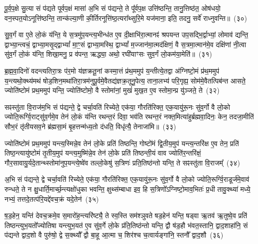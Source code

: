 पू॒र्व॒प॒क्षे सु॒त्या सं प॑द्यते पूर्वप॒क्षं मासा॑ अ॒भि सं प॑द्यन्ते॒ ते पू᳚र्वप॒क्ष उत्ति॑ष्ठन्ति॒ तानु॒त्तिष्ठ॑त॒ ओष॑धयो॒ वन॒स्पत॒यो\-ऽनूत्ति॑ष्ठन्ति॒ तान्क॑ल्या॒णी की॒र्तिरनूत्ति॑ष्ठ॒त्यरा᳚थ्सुरि॒मे यज॑माना॒ इति॒ तदनु॒ सर्वे॑ राध्नुवन्ति॥~(३०)\ip

{\anuvakamend[{ए॒तच्छ॒म्बट्कु॑र्वन्ति॒ तेषा॒ञ्चतु॑स्त्रिꣳशच्च}]}

सु॒व॒र्गं वा ए॒ते लो॒कं य॑न्ति॒ ये स॒त्रमु॑प॒यन्त्य॒भीन्ध॑त ए॒व दी॒क्षाभि॑रा॒त्मानꣴ॑ श्रपयन्त उप॒सद्भि॒र्द्वाभ्यां॒ लोमाव॑ द्यन्ति॒ द्वाभ्या॒न्त्वचं॒ द्वाभ्या॒मसृ॒द्द्वाभ्यां᳚ मा॒ꣳ॒सं द्वाभ्या॒मस्थि॒ द्वाभ्यां᳚ म॒ज्जान॑मा॒त्मद॑क्षिणं॒ वै स॒त्रमा॒त्मान॑मे॒व दक्षि॑णां नी॒त्वा सु॑व॒र्गं लो॒कं य॑न्ति॒ शिखा॒मनु॒ प्र व॑पन्त॒ ऋद्ध्या॒ अथो॒ रघी॑याꣳसः सुव॒र्गं लो॒कम॑या॒मेति॑॥~(३१)\ip

{\anuvakamend[{सु॒व॒र्गं प॑ञ्चा॒शत्}]}

ब्र॒ह्म॒वा॒दिनो॑ वदन्त्यतिरा॒त्रः प॑र॒मो य॑ज्ञक्रतू॒नां कस्मा॒त्तं प्र॑थ॒ममुप॑ य॒न्तीत्ये॒तद्वा अ॑ग्निष्टो॒मं प्र॑थ॒ममुप॑ य॒न्त्यथो॒क्थ्य॑मथ॑ षोड॒शिन॒मथा॑तिरा॒त्रम॑नुपू॒र्वमे॒वैतद्य॑ज्ञक्र॒तूनु॒पेत्य॒ ताना॒लभ्य॑ परि॒गृह्य॒ सोम॑मे॒वैतत्पिब॑न्त आसते॒ ज्योति॑ष्टोमं प्रथ॒ममुप॑ यन्ति॒ ज्योति॑ष्टोमो॒ वै स्तोमा॑नां॒ मुखं॑ मुख॒त ए॒व स्तोमा॒न्प्र यु॑ञ्जते॒ ते~(३२)\ip

सꣴस्तु॑ता वि॒राज॑म॒भि सं प॑द्यन्ते॒ द्वे चर्चा॒वति॑ रिच्येते॒ एक॑या॒ गौरति॑रिक्त॒ एक॒यायु॑रू॒नः सु॑व॒र्गो वै लो॒को ज्योति॒रूर्ग्वि॒राट्सु॑व॒र्गमे॒व तेन॑ लो॒कं य॑न्ति रथन्त॒रं दिवा॒ भव॑ति रथन्त॒रं नक्त॒मित्या॑हुर्ब्रह्मवा॒दिनः॒ केन॒ तदजा॒मीति॑ सौभ॒रं तृ॑तीय\-सव॒ने ब्र॑ह्मसा॒मं बृ॒हत्तन्म॑ध्य॒तो द॑धति॒ विधृ॑त्यै॒ तेनाजा॑मि॥~(३३)\ip

{\anuvakamend[{त एका॒न्नप॑ञ्चा॒शच्च॑}]}%

ज्योति॑ष्टोमं प्रथ॒ममुप॑ यन्त्य॒स्मिन्ने॒व तेन॑ लो॒के प्रति॑ तिष्ठन्ति॒ गोष्टो॑मं द्वि॒तीय॒मुप॑ यन्त्य॒न्तरि॑क्ष ए॒व तेन॒ प्रति॑ तिष्ठ॒न्त्यायु॑ष्टोमं तृ॒तीय॒मुप॑ यन्त्य॒मुष्मि॑न्ने॒व तेन॑ लो॒के प्रति॑ तिष्ठन्ती॒यं वाव ज्योति॑र॒न्तरि॑क्षं॒ गौर॒सावायु॒र्यदे॒तान्थ्स्तोमा॑नुप॒यन्त्ये॒ष्वे॑व तल्लो॒केषु॑ स॒त्रिणः॑ प्रति॒तिष्ठ॑न्तो यन्ति॒ ते सꣴस्तु॑ता वि॒राजम्᳚~(३४)\ip

अ॒भि सं प॑द्यन्ते॒ द्वे चर्चा॒वति॑ रिच्येते॒ एक॑या॒ गौरति॑रिक्त॒ एक॒यायु॑रू॒नः सु॑व॒र्गो वै लो॒को ज्योति॒रूर्ग्वि॒राडूर्ज॑मे॒वाव॑ रुन्धते॒ ते न क्षु॒धार्ति॒मार्च्छ॒न्त्यक्षो॑धुका भवन्ति॒ क्षुथ्स॑म्बाधा इव॒ हि स॒त्रिणो᳚\-ऽग्निष्टो॒माव॒भितः॑ प्र॒धी तावु॒क्थ्या॑ मध्ये॒ नभ्यं॒ तत्तदे॒तत्प॑रि॒यद्दे॑वच॒क्रं यदे॒तेन॑~(३५)\ip

ष॒ड॒हेन॒ यन्ति॑ देवच॒क्रमे॒व स॒मारो॑ह॒न्त्यरि॑ष्ट्यै॒ ते स्व॒स्ति सम॑श्ञुवते षड॒हेन॑ यन्ति॒ षड्वा ऋ॒तव॑ ऋ॒तुष्वे॒व प्रति॑ तिष्ठन्त्युभ॒यतो᳚ज्योतिषा यन्त्युभ॒यत॑ ए॒व सु॑व॒र्गे लो॒के प्र॑ति॒तिष्ठ॑न्तो यन्ति॒ द्वौ ष॑ड॒हौ भ॑वत॒स्तानि॒ द्वाद॒शाहा॑नि॒ सं प॑द्यन्ते द्वाद॒शो वै पुरु॑षो॒ द्वे स॒क्थ्यौ᳚ द्वौ बा॒हू आ॒त्मा च॒ शिर॑श्च च॒त्वार्यङ्गा॑नि॒ स्तनौ᳚ द्वाद॒शौ~(३६)\ip

